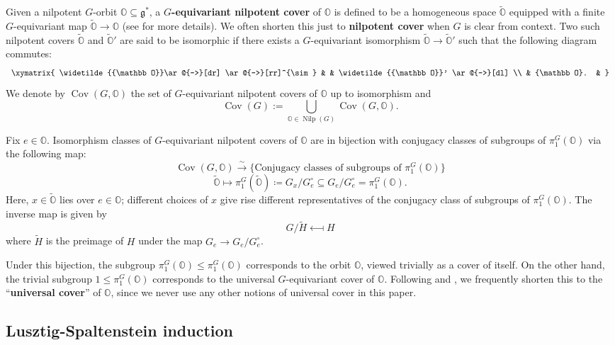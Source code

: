 \documentclass[11pt]{amsart}
\renewcommand{\O}{{\mathbb O}}
\newcommand{\g}{{\mathfrak g}}
\newcommand{\Nilp}{\operatorname{Nilp}}
\newcommand{\Cov}{\operatorname{Cov}}
\newcommand{\covO}{\widetilde{\O}}
\numberwithin{equation}{section}
\begin{document}
	Given a nilpotent $G$-orbit $\O\subseteq \g^{*}$, a  {\bf $G$-equivariant nilpotent cover} of $\O$ is defined to be a homogeneous space $\covO$ equipped with a finite $G$-equivariant map $\covO\to \O$ (see \cite[\S2.2]{LMM} for more details). We often shorten this just to {\bf nilpotent cover} when $G$ is clear from context. Two such nilpotent covers $\covO$ and $\covO'$ are said to be isomorphic if there exists a $G$-equivariant isomorphism $\covO\to \covO'$ such that the following diagram commutes:
	\begin{eqnarray*}
		\label{e: pidiagprop}
		\begin{array}{c}\xymatrix{
				\covO \ar@{->}[dr] \ar@{->}[rr]^{\sim} & &  \covO' \ar@{->}[dl] \\
				& \O. &
			}
		\end{array}
	\end{eqnarray*}
	We denote by $\Cov(G,\O)$ the set of $G$-equivariant nilpotent covers of $\O$ up to isomorphism and $$\Cov(G):=\bigcup_{\O\in\Nilp(G)}\Cov(G,\O).$$
	
	Fix $e\in \O$. Isomorphism classes of $G$-equivariant nilpotent covers of $\O$ are in bijection with conjugacy classes of subgroups of $\pi_1^G(\O)$ via the following map:
	\begin{equation}\label{e: coviso}
		\Cov(G,\O) \xrightarrow{\sim} \{\mbox{Conjugacy classes of subgroups of }\pi_1^G(\O)\}
	\end{equation}
	$$\covO\longmapsto \pi_1^G(\covO)\coloneqq G_x/G_e^\circ\subseteq G_e/G_e^\circ=\pi_1^G(\O).$$ Here, $x\in\covO$ lies over $e\in \O$; different choices of $x$ give rise different representatives of the conjugacy class of subgroups of $\pi_1^G(\O)$. The inverse map is given by $$G/\widetilde{H}\longmapsfrom H$$ where $\widetilde{H}$ is the preimage of $H$ under the map $G_e\to G_e/G_e^\circ$.
	
	Under this bijection, the subgroup $\pi_1^G(\O)\leq \pi_1^G(\O)$ corresponds to the orbit $\O$, viewed trivially as a cover of itself. On the other hand, the trivial subgroup $1\leq \pi_1^G(\O)$ corresponds to the universal $G$-equivariant cover of $\O$. Following \cite{LMM} and \cite{MM}, we frequently shorten this to the ``{\bf universal cover}'' of $\O$, since we never use any other notions of universal cover in this paper.
	
	\subsection{Lusztig-Spaltenstein induction}\label{ss: LSInd}
	
\end{document}
